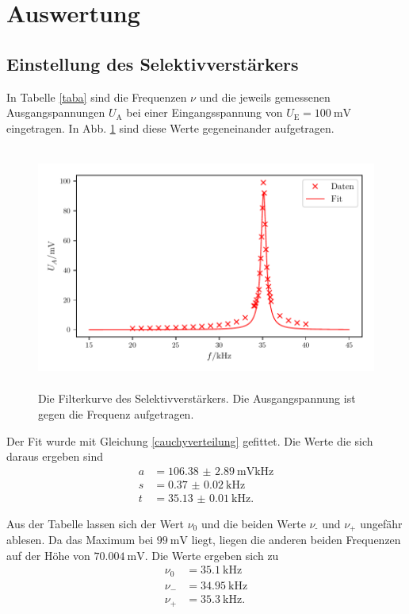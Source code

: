 \section{Auswertung}
\label{sec:Auswertung}

\subsection{Einstellung des Selektivverstärkers}
In Tabelle \ref{taba} sind die Frequenzen $\nu$ und die jeweils gemessenen Ausgangspannungen $U_\text{A}$ 
bei einer Eingangsspannung von $U_\text{E} = \SI{100}{\milli\volt}$ eingetragen. 
In Abb. \ref{plota} sind diese Werte gegeneinander aufgetragen.



\begin{figure}
    \centering
    \includegraphics[width=15cm, height=8cm]{build/plota2.pdf} %
    \caption{Die Filterkurve des Selektivverstärkers. Die Ausgangspannung
    ist gegen die Frequenz aufgetragen.}
    \label{plota}
\end{figure}

Der Fit wurde mit Gleichung \eqref{cauchyverteilung} gefittet. Die Werte die sich daraus ergeben sind
\begin{align*} 
  a &= \SI{106.38(289)}{\milli\volt\kilo\hertz} \\
  s &= \SI{0.37(2)}{\kilo\hertz} \\
  t &= \SI{35.13(1)}{\kilo\hertz}. 
\end{align*}


\noindent Aus der Tabelle lassen sich der Wert $\nu_0$ und die beiden Werte $\nu_\text{-}$ und $\nu_\text{+}$ ungefähr ablesen.
Da das Maximum bei $\SI{99}{\milli\volt}$ liegt, liegen die anderen beiden Frequenzen auf der Höhe von $\SI{70.004}{\milli\volt}$.
Die Werte ergeben sich zu 
\begin{align*} 
 \nu_0 &= \SI{35.1}{\kilo\hertz} \\
 \nu_{-} &= \SI{34.95}{\kilo\hertz} \\
 \nu_{+} &= \SI{35.3}{\kilo\hertz}. 
\end{align*}

